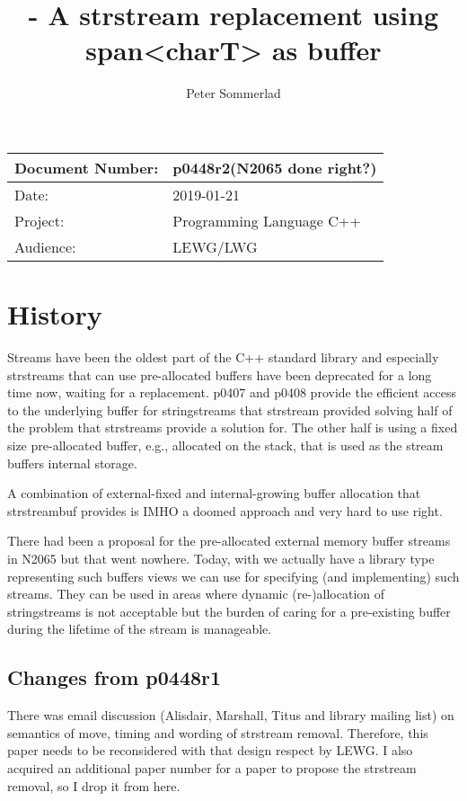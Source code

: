 \documentclass[ebook,11pt,article]{memoir}
\title{\papernumber{} - A strstream replacement using span\textless{}charT\textgreater{} as buffer}
\author{Peter Sommerlad}
\date{\paperdate}                %
\newcommand{\papernumber}{p0448r2}
\newcommand{\paperdate}{2019-01-21}
\begin{document}
\maketitle
\begin{center}
\begin{tabular}[t]{|l|l|}\hline 
Document Number:&  \papernumber \hfill (N2065 done right?)\\\hline
Date: & \paperdate \\\hline
Project: & Programming Language C++\\\hline 
Audience: & LEWG/LWG\\\hline
\end{tabular}
\end{center}
\chapter{History}
Streams have been the oldest part of the C++ standard library and especially strstreams that can use pre-allocated buffers have been deprecated for a long time now, waiting for a replacement. p0407 and p0408 provide the efficient access to the underlying buffer for stringstreams that strstream provided solving half of the problem that strstreams provide a solution for. The other half is using a fixed size pre-allocated buffer, e.g., allocated on the stack, that is used as the stream buffers internal storage.

A combination of external-fixed and internal-growing buffer allocation that strstreambuf provides is IMHO a doomed approach and very hard to use right.

There had been a proposal for the pre-allocated external memory buffer streams in N2065 but that went nowhere. Today, with  we actually have a library type representing such buffers views we can use for specifying (and implementing) such streams. They can be used in areas where dynamic (re-)allocation of stringstreams is not acceptable but the burden of caring for a pre-existing buffer during the lifetime of the stream is manageable. 

\section{Changes from p0448r1}
There was email discussion (Alisdair, Marshall, Titus and library mailing list) on semantics of move, timing and wording of strstream removal. Therefore, this paper needs to be reconsidered with that design respect by LEWG. I also acquired an additional paper number for a paper to propose the strstream removal, so I drop it from here.
\end{document}
